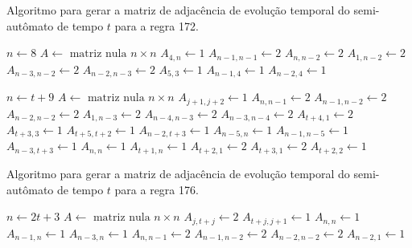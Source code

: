 \documentclass[12pt,a4paper]{article}
\begin{document}
\begin{algorithm}[H]
\caption{Algoritmo para gerar a matriz de adjacência de evolução temporal do
semi-autômato de tempo $t$ para a regra 172.}
\label{alg:r172}
\begin{algorithmic}
    \STATE $n \leftarrow 8$
    \STATE $A \leftarrow \mbox{ matriz nula } n \times n$
    \STATE $A_{4,n} \leftarrow 1$
    \STATE $A_{n-1,n-1} \leftarrow 2$
    \STATE $A_{n,n-2} \leftarrow 2$
    \STATE $A_{1,n-2} \leftarrow 2$
    \STATE $A_{n-3,n-2} \leftarrow 2$
    \STATE $A_{n-2,n-3} \leftarrow 2$
    \STATE $A_{5,3} \leftarrow 1$
    \STATE $A_{n-1,4} \leftarrow 1$
    \STATE $A_{n-2,4} \leftarrow 1$
\end{algorithmic}
\end{algorithm}

\begin{algorithm}[H]
\begin{algorithmic}
\ELSE
    \STATE $n \leftarrow t+9$
    \STATE $A \leftarrow \mbox{ matriz nula } n \times n$
        \STATE $A_{j+1,j+2} \leftarrow 1$
    \ENDFOR
    \STATE $A_{n,n-1} \leftarrow 2$
    \STATE $A_{n-1,n-2} \leftarrow 2$
    \STATE $A_{n-2,n-2} \leftarrow 2$
    \STATE $A_{1,n-3} \leftarrow 2$
    \STATE $A_{n-4,n-3} \leftarrow 2$
    \STATE $A_{n-3,n-4} \leftarrow 2$
    \STATE $A_{t+4,1} \leftarrow 2$
    \STATE $A_{t+3,3} \leftarrow 1$
    \STATE $A_{t+5,t+2} \leftarrow 1$
    \STATE $A_{n-2,t+3} \leftarrow 1$
    \STATE $A_{n-5,n} \leftarrow 1$
    \STATE $A_{n-1,n-5} \leftarrow 1$
    \STATE $A_{n-3,t+3} \leftarrow 1$
\ENDIF
\STATE $A_{n,n} \leftarrow 1$
\STATE $A_{t+1,n} \leftarrow 1$
\STATE $A_{t+2,1} \leftarrow 2$
\STATE $A_{t+3,1} \leftarrow 2$
\STATE $A_{t+2,2} \leftarrow 1$
\end{algorithmic}
\end{algorithm}

\begin{algorithm}[H]
\caption{Algoritmo para gerar a matriz de adjacência de evolução temporal do
semi-autômato de tempo $t$ para a regra 176.}
\label{alg:r176}
\begin{algorithmic}
\STATE $n \leftarrow 2t+3$
\STATE $A \leftarrow \mbox{ matriz nula } n \times n$
    \STATE $A_{j,t+j} \leftarrow 2$
\ENDFOR
{}
    \STATE $A_{t+j,j+1} \leftarrow 1$
\ENDFOR
\STATE $A_{n,n} \leftarrow 1$
\STATE $A_{n-1,n} \leftarrow 1$
\STATE $A_{n-3,n} \leftarrow 1$
\STATE $A_{n,n-1} \leftarrow 2$
\STATE $A_{n-1,n-2} \leftarrow 2$
\STATE $A_{n-2,n-2} \leftarrow 2$
\STATE $A_{n-2,1} \leftarrow 1$
\end{algorithmic}
\end{algorithm}
\end{document}
